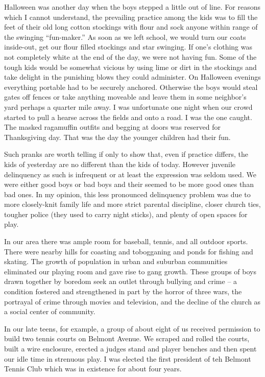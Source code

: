 \documentclass[12pt]{book}              %
\begin{document}
Halloween was another day when the boys stepped a little out of line. For reasons which I cannot understand, the prevailing practice among the kids was to fill the feet of their old long cotton stockings with flour and sock anyone within range of the swinging ``fun-maker.'' As soon as we left school, we would turn our coats inside-out, get our flour filled stockings and star swinging. If one's clothing was not completely white at the end of the day, we were not having fun. Some of the tough kids would be somewhat vicious by using lime or dirt in the stockings and take delight in the punishing blows they could administer. On Halloween evenings everything portable had to be securely anchored. Otherwise the boys would steal gates off fences or take anything moveable and leave them in some neighbor's yard perhaps a quarter mile away. I was unfortunate one night when our crowd started to pull a hearse across the fields and onto a road. I was the one caught. The masked ragamuffin outfits and begging at doors was reserved for Thanksgiving day. That was the day the younger children had their fun.

Such pranks are worth telling if only to show that, even if practice differs, the kids of yesterday are no different than the kids of today. However juvenile delinquency as such is infrequent or at least the expression was seldom used. We were either good boys or bad boys and their seemed to be more good ones than bad ones. In my opinion, this less pronounced delinquency problem was due to more closely-knit family life and more strict parental discipline, closer church ties, tougher police (they used to carry night sticks), and plenty of open spaces for play.

In our area there was ample room for baseball, tennis, and all outdoor sports. There were nearby hills for coasting and tobogganing and ponds for fishing and skating. The growth of population in urban and suburban communities eliminated our playing room and gave rise to gang growth. These groups of boys drawn together by boredom seek an outlet through bullying and crime -- a condition fostered and strengthened in part by the horror of three wars, the portrayal of crime through movies and television, and the decline of the church as a social center of community. 

In our late teens, for example, a group of about eight of us received permission to build two tennis courts on Belmont Avenue. We scraped and rolled the courts, built a wire enclosure, erected a judges stand and player benches and then spent our idle time in strenuous play. I was elected the first president of teh Belmont Tennis Club which was in existence for about four years. 
\end{document}
